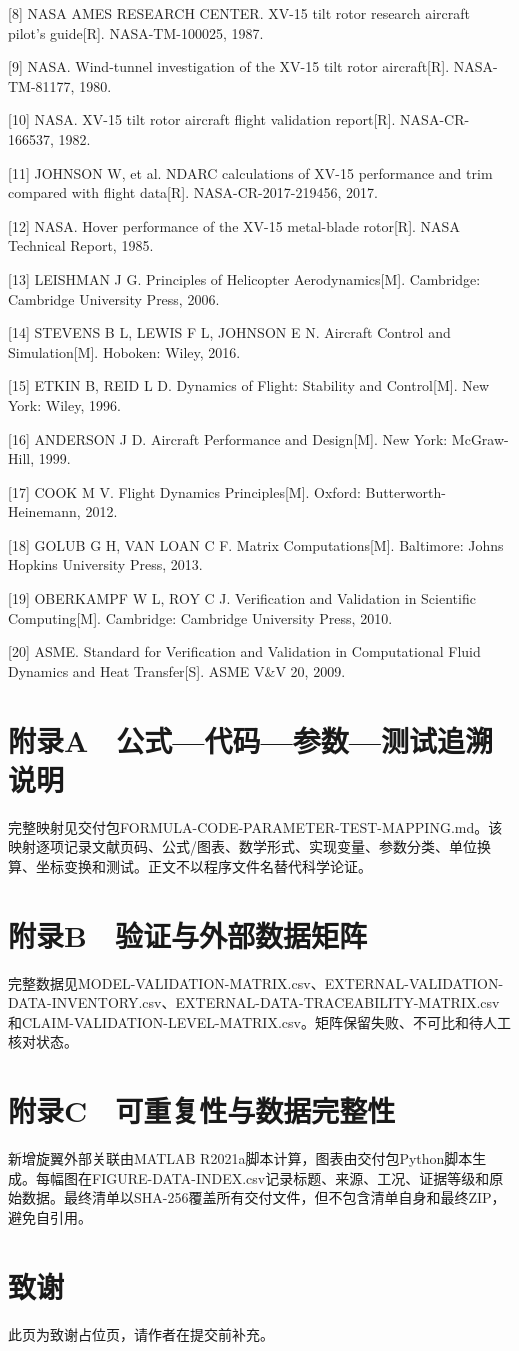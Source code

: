\documentclass[UTF8,12pt,openany]{ctexbook}
\begin{document}
[8] NASA AMES RESEARCH CENTER. XV-15 tilt rotor research aircraft pilot's guide[R]. NASA-TM-100025, 1987.

[9] NASA. Wind-tunnel investigation of the XV-15 tilt rotor aircraft[R]. NASA-TM-81177, 1980.

[10] NASA. XV-15 tilt rotor aircraft flight validation report[R]. NASA-CR-166537, 1982.

[11] JOHNSON W, et al. NDARC calculations of XV-15 performance and trim compared with flight data[R]. NASA-CR-2017-219456, 2017.

[12] NASA. Hover performance of the XV-15 metal-blade rotor[R]. NASA Technical Report, 1985.

[13] LEISHMAN J G. Principles of Helicopter Aerodynamics[M]. Cambridge: Cambridge University Press, 2006.

[14] STEVENS B L, LEWIS F L, JOHNSON E N. Aircraft Control and Simulation[M]. Hoboken: Wiley, 2016.

[15] ETKIN B, REID L D. Dynamics of Flight: Stability and Control[M]. New York: Wiley, 1996.

[16] ANDERSON J D. Aircraft Performance and Design[M]. New York: McGraw-Hill, 1999.

[17] COOK M V. Flight Dynamics Principles[M]. Oxford: Butterworth-Heinemann, 2012.

[18] GOLUB G H, VAN LOAN C F. Matrix Computations[M]. Baltimore: Johns Hopkins University Press, 2013.

[19] OBERKAMPF W L, ROY C J. Verification and Validation in Scientific Computing[M]. Cambridge: Cambridge University Press, 2010.

[20] ASME. Standard for Verification and Validation in Computational Fluid Dynamics and Heat Transfer[S]. ASME V\&V 20, 2009.


\chapter{附录A　公式—代码—参数—测试追溯说明}

完整映射见交付包FORMULA-CODE-PARAMETER-TEST-MAPPING.md。该映射逐项记录文献页码、公式/图表、数学形式、实现变量、参数分类、单位换算、坐标变换和测试。正文不以程序文件名替代科学论证。

\chapter{附录B　验证与外部数据矩阵}

完整数据见MODEL-VALIDATION-MATRIX.csv、EXTERNAL-VALIDATION-DATA-INVENTORY.csv、EXTERNAL-DATA-TRACEABILITY-MATRIX.csv和CLAIM-VALIDATION-LEVEL-MATRIX.csv。矩阵保留失败、不可比和待人工核对状态。

\chapter{附录C　可重复性与数据完整性}

新增旋翼外部关联由MATLAB R2021a脚本计算，图表由交付包Python脚本生成。每幅图在FIGURE-DATA-INDEX.csv记录标题、来源、工况、证据等级和原始数据。最终清单以SHA-256覆盖所有交付文件，但不包含清单自身和最终ZIP，避免自引用。

\backmatter
\printbibliography[title={参考文献}]
\chapter*{致谢}
此页为致谢占位页，请作者在提交前补充。
\end{document}
